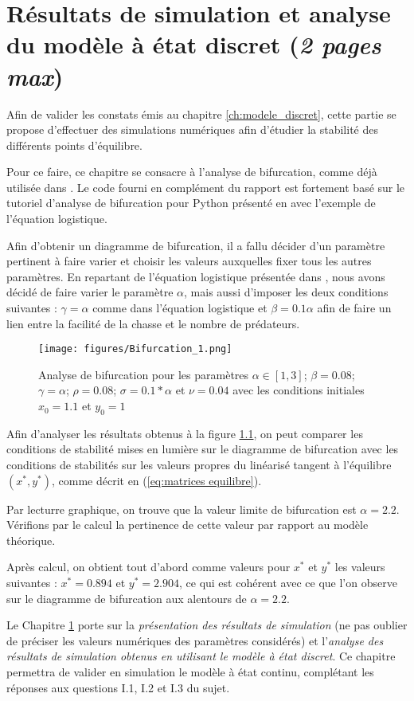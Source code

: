 \chapter{Résultats de simulation et analyse du modèle à état discret (\textit{2 pages max})}
\label{ch:simu}

Afin de valider les constats émis au chapitre \ref{ch:modele_discret}, cette partie se propose d'effectuer des simulations numériques afin d'étudier la stabilité des différents points d'équilibre.

Pour ce faire, ce chapitre se consacre à l'analyse de bifurcation, comme déjà utilisée dans \cite{ChaosControl}. Le code fourni en complément du rapport est fortement basé sur le tutoriel d'analyse de bifurcation pour Python présenté en \cite{bifurc} avec l'exemple de l'équation logistique.

Afin d'obtenir un diagramme de bifurcation, il a fallu décider d'un paramètre pertinent à faire varier et choisir les valeurs auxquelles fixer tous les autres paramètres. En repartant de l'équation logistique présentée dans \cite{bifurc}, nous avons décidé de faire varier le paramètre $\alpha$, mais aussi d'imposer les deux conditions suivantes : $\gamma = \alpha$ comme dans l'équation logistique et $\beta = 0.1 \alpha$ afin de faire un lien entre la facilité de la chasse et le nombre de prédateurs.

\begin{figure}
    \begin{center}
		\texttt{[image: figures/Bifurcation\_1.png]}
	\end{center}
	\caption{Analyse de bifurcation pour les paramètres $\alpha \in [1, 3]$; $\beta = 0.08$; $\gamma = \alpha$; $\rho = 0.08$; $\sigma = 0.1*\alpha$ et $\nu = 0.04$ avec les conditions initiales $x_0 = 1.1$ et $y_0 = 1$}
    \label{fig:bifurc}
\end{figure}

Afin d'analyser les résultats obtenus à la figure \ref{fig:bifurc}, on peut comparer les conditions de stabilité mises en lumière sur le diagramme de bifurcation avec les conditions de stabilités sur les valeurs propres du linéarisé tangent à l'équilibre $(x^*, y^*)$, comme décrit en (\ref{eq:matrices equilibre}).

Par lecturre graphique, on trouve que la valeur limite de bifurcation est $\alpha = 2.2$. Vérifions par le calcul la pertinence de cette valeur par rapport au modèle théorique.

Après calcul, on obtient tout d'abord comme valeurs pour $x^*$ et $y^*$ les valeurs suivantes : $x^* = 0.894$ et $y^* = 2.904$, ce qui est cohérent avec ce que l'on observe sur le diagramme de bifurcation aux alentours de $\alpha = 2.2$.



Le Chapitre \ref{ch:simu} porte sur la \textit{présentation des résultats de simulation} (ne pas oublier de préciser les valeurs numériques des paramètres considérés) et l’\textit{analyse des résultats de simulation obtenus en utilisant le modèle à état discret}.
Ce chapitre permettra de valider en simulation le modèle à état continu, complétant les réponses aux questions I.1, I.2 et I.3 du sujet.
